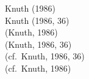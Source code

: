 \begin{frame}[fragile]
\begin{multicols}{2}
Knuth (1986)\\
Knuth (1986, 36)\\
(Knuth, 1986)\\
(Knuth, 1986, 36)\\
(cf.\ Knuth, 1986, 36)\\
(cf.\ Knuth, 1986)\\
\end{multicols}



\end{frame}



